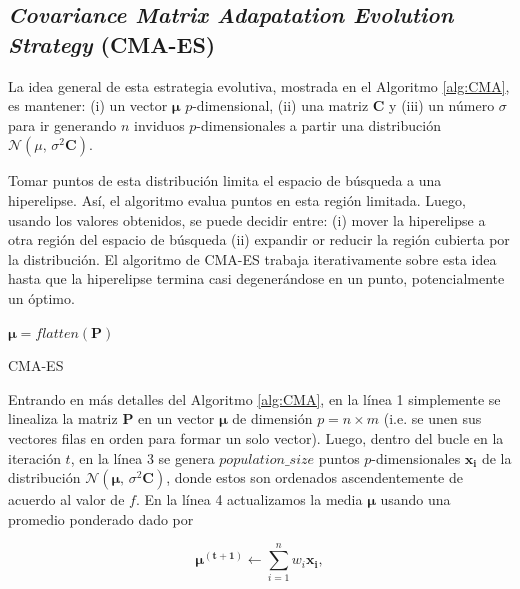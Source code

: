 \subsection{\emph{Covariance Matrix Adapatation Evolution Strategy} (CMA-ES)}\label{sec:cma-es}

La idea general de esta estrategia evolutiva, mostrada en el Algoritmo
\ref{alg:CMA}, es mantener:
(i) un vector $\boldsymbol{\mu}$ $p$-dimensional,
(ii) una matriz $\boldsymbol{C}$ y
(iii) un número $\sigma$ para ir generando $n$ inviduos $p$-dimensionales
a partir una distribución $\mathcal{N}(\mu,\,\sigma^{2} \boldsymbol{C})$.


Tomar puntos de esta distribución limita el espacio de búsqueda a una
hiperelipse.
Así, el algoritmo evalua puntos en esta región limitada.
Luego, usando los valores obtenidos, se puede decidir entre:
(i) mover la hiperelipse a otra región del espacio de búsqueda
(ii) expandir or reducir la región cubierta por la distribución.
El algoritmo de CMA-ES trabaja iterativamente sobre esta idea hasta que la
hiperelipse termina casi degenerándose en un punto, 
potencialmente un óptimo.

\begin{algorithm}
\KwResult{$\boldsymbol{\mu}$}
$\boldsymbol{\mu} = flatten(\boldsymbol{P})$ \\
\caption{CMA-ES}
\label{alg:CMA}
\end{algorithm}


Entrando en más detalles del Algoritmo \ref{alg:CMA},
en la línea 1 simplemente se linealiza la matriz $\boldsymbol{P}$ en un vector $\boldsymbol{\mu}$ 
de dimensión $p = n \times m$ (i.e. se unen sus vectores filas en orden para formar un solo vector).
Luego, dentro del bucle en la iteración $t$, en la línea 3 se genera $population\_size$ puntos
$p$-dimensionales $\boldsymbol{x_i}$ de la distribución $\mathcal{N}(\boldsymbol{\mu},\,\sigma^{2} \boldsymbol{C})$, 
donde estos son ordenados ascendentemente de acuerdo
al valor de $f$.
En la línea 4 actualizamos la media $\boldsymbol{\mu}$ usando una promedio ponderado dado
por

\begin{equation}
  \boldsymbol{\mu^{(t + 1)}} \gets \sum_{i=1}^{n} w_i \boldsymbol{x_i},
\label{cma-average}
\end{equation}


